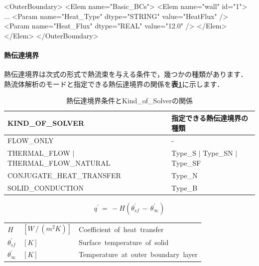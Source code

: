 {\small
\begin{program}
<OuterBoundary>
  <Elem name="Basic_BCs">
    <Elem name="wall" id="1">
      ...
      <Param name="Heat_Type"       dtype="STRING" value="HeatFlux" />
      <Param name="Heat_Flux"       dtype="REAL"   value="12.0" />
    </Elem>
  </Elem>
</OuterBoundary>
\end{program}
}


%
\hypertarget{tgt:heat-transfer}{\paragraph{熱伝達境界}}
熱伝達境界は次式の形式で熱流束を与える条件で，幾つかの種類があります．
熱流体解析のモードと指定できる熱伝達境界の関係を\textbf{表\ref{tbl:type of HT}}に示します．

\begin{table}[htdp]
\caption{熱伝達境界条件とKind\_of\_Solverの関係}
\begin{center}
\small
\begin{tabular}{ll} \toprule
KIND\_OF\_SOLVER & 指定できる熱伝達境界の種類\\ \midrule
FLOW\_ONLY & -\\
THERMAL\_FLOW $|$ THERMAL\_FLOW\_NATURAL & Type\_S $|$ Type\_SN $|$ Type\_SF\\
CONJUGATE\_HEAT\_TRANSFER & Type\_N\\
SOLID\_CONDUCTION & Type\_B\\ \bottomrule
\end{tabular}
\end{center}
\label{tbl:type of HT}
\end{table}


\begin{equation}
q^{\prime} \,=\, -H(\theta_{sf}^{\prime}\,-\,\theta_{\infty}^{\prime})
\label{eq:ht form}
\end{equation}

\begin{center}
\begin{tabular}{lll}
$H$ &  $[W\,/\,(m^2K)]$ & Coefficient\, of\, heat\, transfer\\
$\theta_{sf}^{\prime}$ & $[K]$ & Surface\, temperature\, of\, solid\\
$\theta_{\infty}^{\prime}$ & $[K]$ & Temperature\, at\, outer\, boundary\, layer\\
\end{tabular}
\end{center}

